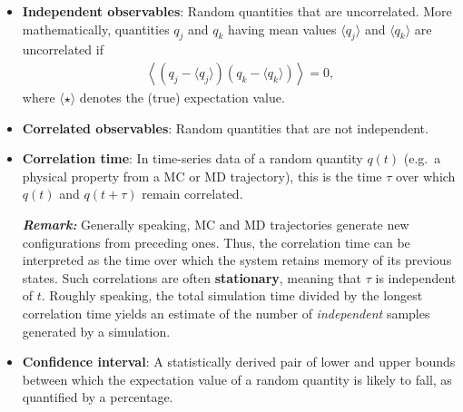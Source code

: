 \begin{itemize}
\item {\bf Independent observables}:  Random quantities that are uncorrelated.
More mathematically, quantities $q_j$ and $q_k$ having mean values $\langle q_j \rangle $ and $\langle q_k \rangle$ are uncorrelated if
\begin{align}
\left \langle \left(q_j - \langle q_j \rangle \right) \left( q_k - \langle q_k \rangle \right) \right \rangle = 0,
\end{align}
where $\langle \star \rangle$ denotes the (true) expectation value.

\item {\bf Correlated observables}: Random quantities that are not independent.

\item {\bf Correlation time}: In time-series data of a random quantity $q(t)$ (e.g.\ a physical property from a MC or MD trajectory), this is the time $\tau$ over which $q(t)$ and $q(t+\tau)$ remain correlated.

\medskip

\textbf{\textit{Remark:}} Generally speaking, MC and MD trajectories generate new configurations from preceding ones.
Thus, the correlation time can be interpreted as the time over which the system retains memory of its previous states.
Such correlations are often {\bf stationary}, meaning that $\tau$ is independent of $t$.
Roughly speaking, the total simulation time divided by the longest correlation time yields an estimate of the number of {\it independent} samples generated by a simulation.



\item {\bf Confidence interval}: A statistically derived pair of lower and upper bounds between which the expectation value of a random quantity is likely to fall, as quantified by a percentage.






\end{itemize}
